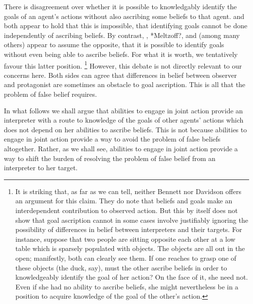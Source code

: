 \documentclass[12pt,a4paper]{extarticle}
\begin{document}
There is disagreement over whether it is possible to knowledgably identify the goals of an agent's actions without also ascribing some beliefs to that agent.  
\citet[pp.48--50]{Bennett:1976rg}
and 
\citet{Davidson:1974gh}
both appear to hold that this is impossible,
that identifying goals cannot be done independently of ascribing beliefs.
By contrast,
\citet{Gergely:1995sq},
*Meltzoff?,
\citet{Baillargeon:gx}
and 
\citet{Woodward:1998dm}
(among many others)
appear to assume the opposite, 
that it is possible to identify goals without even being able to ascribe beliefs.
For what it is worth, we tentatively favour this latter position.%
\footnote{
It is striking that, as far as we can tell, neither Bennett nor Davidson offers an argument for this claim.
They do note that beliefs and goals make an interdependent contribution to observed action.
But this by itself does not show that goal ascription cannot in some cases involve justifiably ignoring the possibility of differences in belief between interpreters and their targets.
For instance,
suppose that two people are sitting opposite each other at a low table
 which is 
sparsely populated with objects.
The objects are all out in the open; manifestly, both can clearly see them.
If one reaches to grasp one of these objects (the duck, say), 
must the other ascribe beliefs in order to knowledgeably identify the goal of her action?
On the face of it, she need not.  
Even if she had no ability to ascribe beliefs, she might nevertheless be in a position to acquire knowledge of the goal of the other's action.
}
However, this debate is not directly relevant to our concerns here.
Both sides can agree that 
differences in belief between observer and protagonist
are sometimes an obstacle to goal ascription.
This is all that the problem of false belief requires.

In what follows we shall argue that abilities to engage in joint action provide an interpreter with a route to knowledge of the goals of other agents' actions which does not depend on her abilities to ascribe beliefs.
This is not because abilities to engage in joint action provide a way to avoid the problem of false beliefs altogether.
Rather, as we shall see, abilities to engage in joint action provide a way to shift the burden of resolving the problem of false belief from an interpreter to her target.
\end{document}
